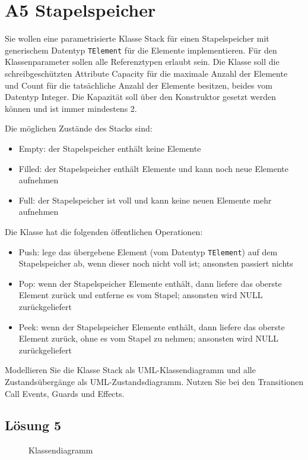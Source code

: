 \documentclass[main.tex]{subfiles}
\begin{document}
\section{A5 Stapelspeicher}
Sie wollen eine parametrisierte Klasse Stack für einen Stapelspeicher mit generischem Datentyp \texttt{TElement} für die Elemente implementieren. Für den Klassenparameter sollen alle Referenztypen erlaubt sein. Die Klasse soll die schreibgeschützten Attribute Capacity für die maximale Anzahl der Elemente und Count für die tatsächliche Anzahl der Elemente besitzen, beides vom Datentyp Integer.
Die Kapazität soll über den Konstruktor gesetzt werden können und ist immer mindestens 2.

Die möglichen Zustände des Stacks sind:
\begin{itemize}
    \item Empty: der Stapelspeicher enthält keine Elemente
    \item Filled: der Stapelspeicher enthält Elemente und kann noch neue Elemente aufnehmen
    \item Full: der Stapelspeicher ist voll und kann keine neuen Elemente mehr aufnehmen
\end{itemize}

Die Klasse hat die folgenden öffentlichen Operationen:
\begin{itemize}
    \item Push: lege das übergebene Element (vom Datentyp \texttt{TElement}) auf dem Stapelspeicher ab, wenn dieser noch nicht voll ist; ansonsten passiert nichts
    \item Pop: wenn der Stapelspeicher Elemente enthält, dann liefere das oberste Element zurück und entferne es vom Stapel; ansonsten wird NULL zurückgeliefert
    \item Peek: wenn der Stapelspeicher Elemente enthält, dann liefere das oberste Element zurück, ohne es vom Stapel zu nehmen; ansonsten wird NULL zurückgeliefert
\end{itemize}

Modellieren Sie die Klasse Stack als UML-Klassendiagramm und alle Zustandsübergänge als UML-Zustandsdiagramm. Nutzen Sie bei den Transitionen Call Events, Guards und Effects.
\pagebreak
\subsection{Lösung 5}
\begin{figure}[ht!]
    \caption{Klassendiagramm}
    \label{fig:lgs5a}
\end{figure}
\end{document}

